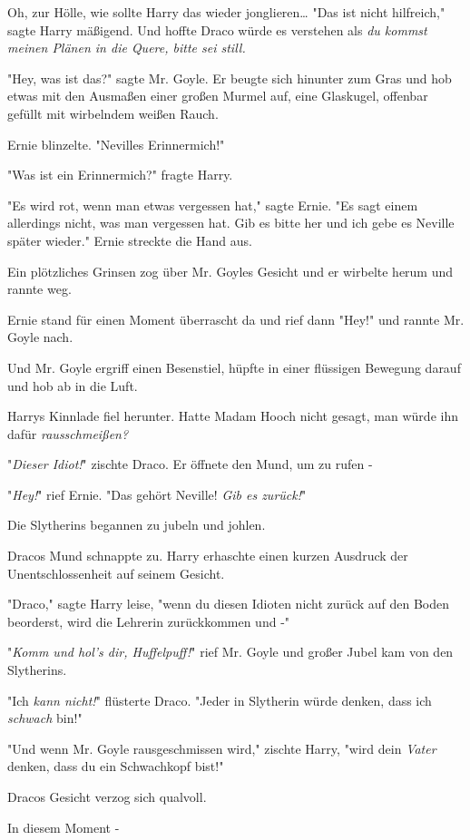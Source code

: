 {Oh, zur Hölle, wie sollte Harry das wieder jonglieren… "Das ist nicht hilfreich," sagte Harry mäßigend. Und hoffte Draco würde es verstehen als \emph{du kommst meinen Plänen in die Quere, bitte sei still.}

"Hey, was ist das?" sagte Mr. Goyle. Er beugte sich hinunter zum Gras und hob etwas mit den Ausmaßen einer großen Murmel auf, eine Glaskugel, offenbar gefüllt mit wirbelndem weißen Rauch.

Ernie blinzelte. "Nevilles Erinnermich!"

"Was ist ein Erinnermich?" fragte Harry.

"Es wird rot, wenn man etwas vergessen hat," sagte Ernie. "Es sagt einem allerdings nicht, was man vergessen hat. Gib es bitte her und ich gebe es Neville später wieder." Ernie streckte die Hand aus.

Ein plötzliches Grinsen zog über Mr. Goyles Gesicht und er wirbelte herum und rannte weg.

Ernie stand für einen Moment überrascht da und rief dann "Hey!" und rannte Mr. Goyle nach.

Und Mr. Goyle ergriff einen Besenstiel, hüpfte in einer flüssigen Bewegung darauf und hob ab in die Luft.

Harrys Kinnlade fiel herunter. Hatte Madam Hooch nicht gesagt, man würde ihn dafür \emph{rausschmeißen?}

"\emph{Dieser Idiot!}" zischte Draco. Er öffnete den Mund, um zu rufen -

"\emph{Hey!}" rief Ernie. "Das gehört Neville! \emph{Gib es zurück!}"

Die Slytherins begannen zu jubeln und johlen.

Dracos Mund schnappte zu. Harry erhaschte einen kurzen Ausdruck der Unentschlossenheit auf seinem Gesicht.

"Draco," sagte Harry leise, "wenn du diesen Idioten nicht zurück auf den Boden beorderst, wird die Lehrerin zurückkommen und -"

"\emph{Komm und hol's dir, Huffelpuff!}" rief Mr. Goyle und großer Jubel kam von den Slytherins.

"Ich \emph{kann nicht!}" flüsterte Draco. "Jeder in Slytherin würde denken, dass ich \emph{schwach} bin!"

"Und wenn Mr. Goyle rausgeschmissen wird," zischte Harry, "wird dein \emph{Vater} denken, dass du ein Schwachkopf bist!"

Dracos Gesicht verzog sich qualvoll.

In diesem Moment -

}
